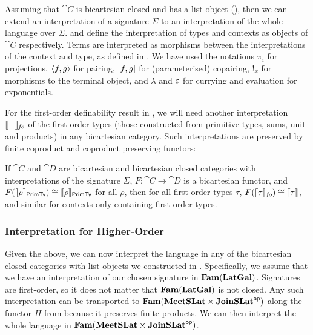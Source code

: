 Assuming that $\cat{C}$ is bicartesian closed and has a list object (), then we can extend an
interpretation of a signature $\Sigma$ to an interpretation of the whole language over
$\Sigma$.  and  define the interpretation of types and
contexts as objects of $\cat{C}$ respectively. Terms are interpreted as morphisms between the interpretations
of the context and type, as defined in . We have used the notations $\pi_i$ for
projections, $\langle f, g\rangle$ for pairing, $[f, g]$ for (parameterised) copairing, $!_x$ for morphisms
to the terminal object, and $\lambda$ and $\varepsilon$ for currying and evaluation for exponentials.

For the first-order definability result in , we will need another interpretation
$\llbracket - \rrbracket_{\mathit{fo}}$ of the first-order types (those constructed from primitive types, sums, unit and
products) in any bicartesian category. Such interpretations are preserved by finite coproduct and coproduct
preserving functors:

\begin{lemma}\label{lem:first-order-agreement-types}
  If $\cat{C}$ and $\cat{D}$ are bicartesian and bicartesian closed categories with interpretations of the
  signature $\Sigma$, $F : \cat{C} \to \cat{D}$ is a bicartesian functor, and
  $F(\llbracket \rho \rrbracket_{\mathsf{PrimTy}}) \cong \llbracket \rho \rrbracket_{\mathsf{PrimTy}}$ for all $\rho$, then for all first-order types $\tau$,
  $F(\llbracket \tau \rrbracket_{\mathit{fo}}) \cong \llbracket \tau \rrbracket$, and similar for contexts only containing first-order types.
\end{lemma}

\subsubsection{Interpretation for Higher-Order \GPS}

Given the above, we can now interpret the language in any of the bicartesian closed categories with list
objects we constructed in . Specifically, we assume that we have an interpretation
of our chosen signature in $\mathbf{Fam}(\mathbf{LatGal})$. Signatures are first-order, so it does not matter that
$\mathbf{Fam}(\mathbf{LatGal})$ is not closed. Any such interpretation can be transported to
$\mathbf{Fam}(\mathbf{MeetSLat} \times \mathbf{JoinSLat}^{\mathsf{op}})$ along the functor $H$ from  because it preserves
finite products. We can then interpret the whole language in $\mathbf{Fam}(\mathbf{MeetSLat} \times \mathbf{JoinSLat}^{\mathsf{op}})$.

